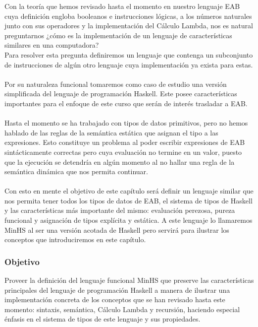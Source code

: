 Con la teoría que hemos revisado hasta el momento en nuestro lenguaje \textsf{EAB} cuya definición engloba booleanos e instrucciones lógicas, a los números naturales junto con sus operadores y la implementación del Cálculo Lambda, nos es natural preguntarnos  ¿cómo es la implementación de un lenguaje de características similares en una computadora? \\ Para resolver esta pregunta definiremos un lenguaje que contenga un subconjunto de instrucciones de algún otro lenguaje cuya implementación ya exista para estas.  \\\\
Por su naturaleza funcional tomaremos como caso de estudio una versión simplificada del lenguaje de programación \textsf{Haskell}. Este posee características importantes para el enfoque de este curso que serán de interés trasladar a \textsf{EAB}. \\\\
Hasta el momento se ha trabajado con tipos de datos primitivos, pero no hemos hablado de las reglas de la semántica estática que asignan el tipo a las expresiones. Esto constituye un problema al poder escribir expresiones de \textsf{EAB} sintácticamente correctas pero cuya evaluación no termine en un valor, puesto que la ejecución se detendría en algún momento al no hallar una regla de la semántica dinámica que nos permita continuar. \\\\
Con esto en mente el objetivo de este capítulo será definir un lenguaje similar que nos permita tener todos los tipos de datos de \textsf{EAB}, el sistema de tipos de \textsf{Haskell} y las características más importante del mismo: evaluación perezosa, pureza funcional y asignación de tipos explícita y estática. 
A este lenguaje lo llamaremos \textsf{MinHS} al ser una versión acotada de \textsf{Haskell} pero servirá para ilustrar los conceptos que introduciremos en este capítulo.

\subsubsection{Objetivo}
Proveer la definición del lenguaje funcional \textsf{MinHS} que preserve las características principales del lenguaje de programación \textsf{Haskell} a manera de ilustrar una implementación concreta de los conceptos que se han revisado hasta este momento: sintaxis, semántica, Cálculo Lambda y recursión, haciendo especial énfasis en el sistema de tipos de este lenguaje y sus propiedades.


